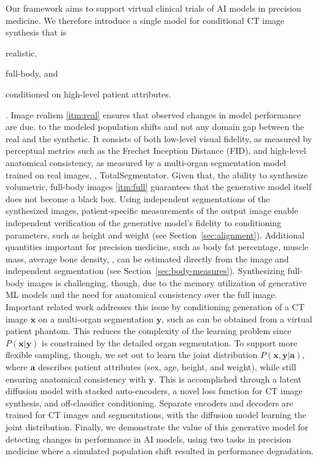 Our framework aims to support virtual clinical trials of AI models in precision medicine.
We therefore introduce a single model for conditional CT image synthesis that is \begin{inlistalpha}
  \item\label{itm:real} realistic,
  \item\label{itm:full} full-body, and
  \item\label{itm:cond} conditioned on high-level patient attributes.
\end{inlistalpha}.
Image realism \ref{itm:real} ensures that observed changes in model performance are due. to the modeled population shifts and not any domain gap between the real and the synthetic. It consists of both low-level visual fidelity, as measured by perceptual metrics such as the Frechet Inception Distance (FID), and high-level anatomical consistency, as measured by a multi-organ segmentation model trained on real images, \ie, TotalSegmentator\cite{wasserthal2023totalsegmentator}.
Given that, the ability to synthesize volumetric, full-body images \ref{itm:full} guarantees that the generative model itself does not become a black box.
Using independent segmentations of the synthesized images, patient-specific measurements of the output image enable independent verification of the generative model's fidelity to conditioning parameters, such as height and weight (see Section~\ref{sec:alignment}).
Additional quantities important for precision medicine, such as body fat percentage, muscle mass, average bone density, \etc, can be estimated directly from the image and independent segmentation (see Section~\ref{sec:body-measures}).
Synthesizing full-body images is challenging, though, due to the memory utilization of generative ML models\cite{guo2024maisi} and the need for anatomical consistency over the full image.\cite{hamamci2023generatect}
Important related work addresses this issue by conditioning generation of a CT image $\mathbf{x}$ on a multi-organ segmentation $\mathbf{y}$,\cite{guo2024maisi} such as can be obtained from a virtual patient phantom.\cite{abadi2020virtual} This reduces the complexity of the learning problem since $P(\mathbf{x}|\mathbf{y})$ is constrained by the detailed organ segmentation. To support more flexible sampling, though, we set out to learn the joint distribution $P(\mathbf{x},\mathbf{y}|\mathbf{a})$, where $\mathbf{a}$ describes patient attributes (sex, age, height, and weight), while still ensuring anatomical consistency with $\mathbf{y}$.
This is accomplished through a latent diffusion model with stacked auto-encoders, a novel loss function for CT image synthesis, and off-classifier conditioning.
Separate encoders and decoders are trained for CT images and segmentations, with the diffusion model learning the joint distribution.
Finally, we demonstrate the value of this generative model for detecting changes in performance in AI models, using two tasks in precision medicine where a simulated population shift resulted in performance degradation.
